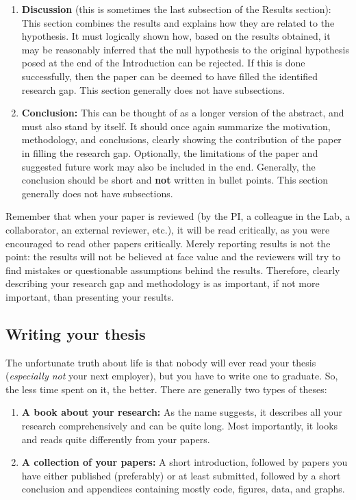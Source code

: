 \documentclass[12pt]{article}
\begin{document}
\begin{enumerate}
	\item \textbf{Discussion} (this is sometimes the last subsection of the Results section): This section combines the results and explains how they are related to the hypothesis. It must logically shown how, based on the results obtained, it may be reasonably inferred that the null hypothesis to the original hypothesis posed at the end of the Introduction can be rejected. If this is done successfully, then the paper can be deemed to have filled the identified research gap. This section generally does not have subsections.
	\item \textbf{Conclusion:} This can be thought of as a longer version of the abstract, and must also stand by itself. It should once again summarize the motivation, methodology, and conclusions, clearly showing the contribution of the paper in filling the research gap. Optionally, the limitations of the paper and suggested future work may also be included in the end. Generally, the conclusion should be short and \textbf{not} written in bullet points. This section generally does not have subsections.
\end{enumerate}

Remember that when your paper is reviewed (by the PI, a colleague in the Lab, a collaborator, an external reviewer, etc.), it will be read critically, as you were encouraged to read other papers critically. Merely reporting results is not the point: the results will not be believed at face value and the reviewers will try to find mistakes or questionable assumptions behind the results. Therefore, clearly describing your research gap and methodology is as important, if not more important, than presenting your results. 

\subsection{Writing your thesis}
The unfortunate truth about life is that nobody will ever read your thesis (\textit{especially not} your next employer), but you have to write one to graduate. So, the less time spent on it, the better. There are generally two types of theses:

\begin{enumerate}
	\item \textbf{A book about your research:} As the name suggests, it describes all your research comprehensively and can be quite long. Most importantly, it looks and reads quite differently from your papers.
	\item \textbf{A collection of your papers:} A short introduction, followed by papers you have either published (preferably) or at least submitted, followed by a short conclusion and appendices containing mostly code, figures, data, and graphs.
\end{enumerate}
\end{document}
